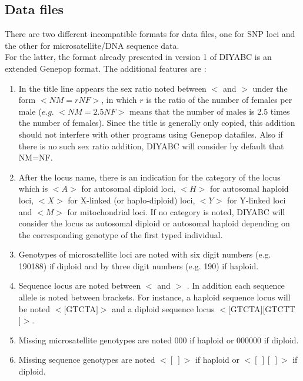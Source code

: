\subsection{Data files}
There are two different incompatible formats for data files, one for SNP loci and the other for microsatellite/DNA sequence data.\\ For the latter, the format already presented in version 1 of DIYABC is an extended Genepop format. The additional features are :
\begin{enumerate}
\item In the title line appears the sex ratio noted between \textsf{$<$} and \textsf{$>$} under the form \textsf{$<NM=rNF>$}, in which $r$ is the ratio of the number of females per male ($e.g.$ \textsf{$<NM=2.5NF>$} means that the number of males is 2.5 times the number of females). Since the title is generally only copied, this addition should not interfere with other programs using  Genepop datafiles. Also if there is no such sex ratio addition, DIYABC will consider by default that NM=NF.
\item After the locus name, there is an indication for the category of the locus which is $<A>$ for autosomal diploid loci, $<H>$ for autosomal haploid loci, $<X>$ for X-linked (or haplo-diploid) loci, $<Y>$ for Y-linked loci and $<M>$ for mitochondrial loci. If no category is noted, DIYABC will consider the locus as autosomal diploid or autosomal haploid depending on the corresponding genotype of the first typed individual.
\item Genotypes of microsatellite loci are noted with six digit numbers (e.g. 190188) if diploid and by three digit numbers (e.g. 190) if haploid.
\item Sequence locus are noted between  \textsf{$<$} and \textsf{$>$} . In addition each sequence allele is noted between brackets. For instance, a haploid sequence locus  will be noted $<[$GTCTA$]>$ and a diploid sequence locus $<[$GTCTA$][$GTCTT$]>$.
\item Missing microsatellite genotypes are noted \textsf{000} if haploid or \textsf{000000} if diploid.
\item Missing sequence genotypes are noted $<[\ ]>$ if haploid or $<[\ ][\ ]>$ if diploid.
\end{enumerate}

